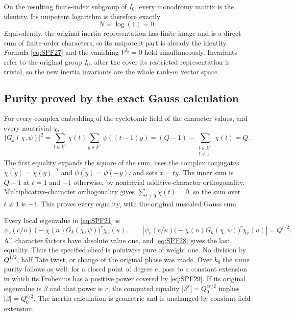 On the resulting finite-index subgroup of \(I_0\), every
monodromy matrix is the identity. Its unipotent logarithm is
therefore exactly
\[
 N=\log(1)=0.
 \tag{SPF.27}\label{eq:SPF27}
\]
Equivalently, the original inertia representation has finite
image and is a direct sum of finite-order characters, so its
unipotent part is already the identity. Formula
\eqref{eq:SPF27} and the vanishing \(V^{I_0}=0\) hold
simultaneously. Invariants refer to the original group
\(I_0\); after the cover its restricted representation is
trivial, so the new inertia invariants are the whole
rank-\(m\) vector space.

\subsection{Purity proved by the exact Gauss calculation}

For every complex embedding of the cyclotomic field of the
character values, and every nontrivial \(\chi\),
\[
 |G_k(\chi,\psi)|^2
   =\sum_{t\in k^\times}\chi(t)
       \sum_{y\in k^\times}\psi((t-1)y)
   =(Q-1)-\sum_{\substack{t\in k^\times\\t\ne1}}\chi(t)
   =Q.
 \tag{SPF.28}\label{eq:SPF28}
\]
The first equality expands the square of the sum, uses the
complex conjugates \(\overline{\chi(y)}=\chi(y)^{-1}\) and
\(\overline{\psi(y)}=\psi(-y)\), and sets \(x=ty\).
The inner sum is \(Q-1\) at \(t=1\) and \(-1\) otherwise,
by nontrivial additive-character orthogonality.
Multiplicative-character orthogonality gives
\(\sum_{t\ne0}\chi(t)=0\), so the sum over \(t\ne1\) is
\(-1\). This proves every equality, with the original
unscaled Gauss sum.

Every local eigenvalue in \eqref{eq:SPF21} is
\[
 \psi_r(c/u)\,
       \bigl(-\chi(n)G_k(\chi,\psi)\bigr)^r\chi_r(u),
 \qquad
 \left|\psi_r(c/u)
       \bigl(-\chi(n)G_k(\chi,\psi)\bigr)^r\chi_r(u)\right|
       =Q^{r/2}.
 \tag{SPF.29}\label{eq:SPF29}
\]
All character factors have absolute value one, and
\eqref{eq:SPF28} gives the last equality. Thus the
specified sheaf is pointwise pure of weight one.
No division by \(Q^{1/2}\), half Tate twist, or change of
the original phase was made. Over \(k_0\) the same purity
follows as well: for a closed point of degree \(e\), pass
to a constant extension in which its Frobenius has a
positive power covered by \eqref{eq:SPF29}. If its original
eigenvalue is \(\beta\) and that power is \(r\), the computed
equality \(|\beta^r|=Q_0^{er/2}\) implies
\(|\beta|=Q_0^{e/2}\). The inertia calculation is geometric
and is unchanged by constant-field extension.

